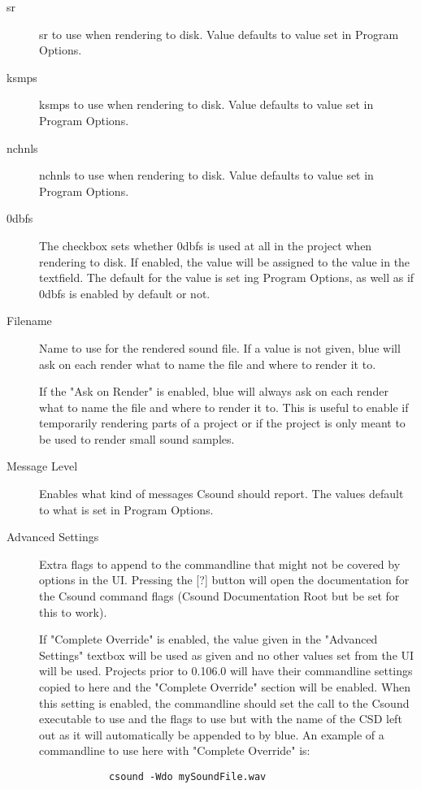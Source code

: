 \begin{description}
\item[sr]
sr to use when rendering to disk. Value defaults to value set in Program
Options.
\item[ksmps]
ksmps to use when rendering to disk. Value defaults to value set in
Program Options.
\item[nchnls]
nchnls to use when rendering to disk. Value defaults to value set in
Program Options.
\item[0dbfs]
The checkbox sets whether 0dbfs is used at all in the project when
rendering to disk. If enabled, the value will be assigned to the value
in the textfield. The default for the value is set ing Program Options,
as well as if 0dbfs is enabled by default or not.
\item[Filename]
Name to use for the rendered sound file. If a value is not given, blue
will ask on each render what to name the file and where to render it to.

If the "Ask on Render" is enabled, blue will always ask on each render
what to name the file and where to render it to. This is useful to
enable if temporarily rendering parts of a project or if the project is
only meant to be used to render small sound samples.
\item[Message Level]
Enables what kind of messages Csound should report. The values default
to what is set in Program Options.
\item[Advanced Settings]
Extra flags to append to the commandline that might not be covered by
options in the UI. Pressing the {[}?{]} button will open the
documentation for the Csound command flags (Csound Documentation Root
but be set for this to work).

If "Complete Override" is enabled, the value given in the "Advanced
Settings" textbox will be used as given and no other values set from the
UI will be used. Projects prior to 0.106.0 will have their commandline
settings copied to here and the "Complete Override" section will be
enabled. When this setting is enabled, the commandline should set the
call to the Csound executable to use and the flags to use but with the
name of the CSD left out as it will automatically be appended to by
blue. An example of a commandline to use here with "Complete Override"
is:

\begin{verbatim}
            csound -Wdo mySoundFile.wav
          
\end{verbatim}
\end{description}

